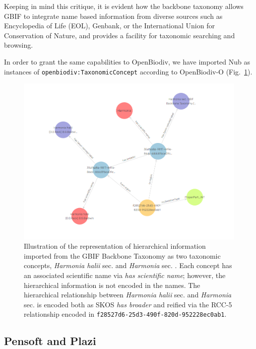 Keeping in mind this critique, it is evident how the backbone taxonomy allows GBIF to integrate name based information from diverse sources such as Encyclopedia of Life (EOL), Genbank, or the International Union for Conservation of Nature, and provides a facility for taxonomic searching and browsing.

In order to grant the same capabilities to OpenBiodiv, we have imported Nub as instances of {\tt openbiodiv:TaxonomicConcept} according to OpenBiodiv-O (Fig.~\ref{fig:harmonia-halii-visual}).
\begin{figure}
\centering
\includegraphics[width=\textwidth]{Figures/harmonia-halii-visgraph}
\decoRule
\caption[Visual graph of \emph{Harmonia halii}]{Illustration of the representation of hierarchical information imported from the GBIF Backbone Taxonomy as two taxonomic concepts, \emph{Harmonia halii} sec. \cite{gbif_secretariat_gbif_2017} and \emph{Harmonia} sec. \cite{gbif_secretariat_gbif_2017}. Each concept has an associated scientific name via \emph{has scientific name}; however, the hierarchical information is not encoded in the names. The hierarchical relationship between \emph{Harmonia halii} sec. \cite{gbif_secretariat_gbif_2017} and \emph{Harmonia} sec. \cite{gbif_secretariat_gbif_2017} is encoded both as SKOS \emph{has broader} and reified via the RCC-5 relationship encoded in {\tt f28527d6-25d3-490f-820d-952228ec0ab1}.}
\label{fig:harmonia-halii-visual}
\end{figure}


\subsection{Pensoft and Plazi}

